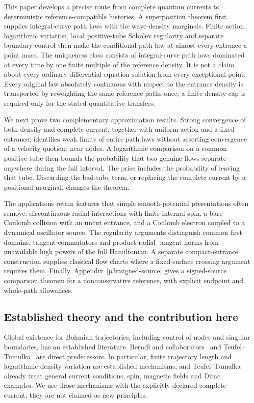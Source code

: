 \documentclass[11pt]{article}
\numberwithin{equation}{section}
\theoremstyle{definition}
\theoremstyle{remark}
\begin{document}
This paper develops a precise route from complete quantum currents to deterministic reference-compatible histories. A superposition theorem first supplies integral-curve path laws with the wave-density marginals. Finite action, logarithmic variation, local positive-tube Sobolev regularity and separate boundary control then make the conditional path law at almost every entrance a point mass. The uniqueness class consists of integral-curve path laws dominated at every time by one finite multiple of the reference density. It is not a claim about every ordinary differential equation solution from every exceptional point. Every original law absolutely continuous with respect to the entrance density is transported by reweighting the same reference paths once; a finite density cap is required only for the stated quantitative transfers.

We next prove two complementary approximation results. Strong convergence of both density and complete current, together with uniform action and a fixed entrance, identifies weak limits of entire path laws without asserting convergence of a velocity quotient near nodes. A logarithmic comparison on a common positive tube then bounds the probability that two genuine flows separate anywhere during the full interval. The price includes the probability of leaving that tube. Discarding the bad-tube term, or replacing the complete current by a positional marginal, changes the theorem.

The applications retain features that simple smooth-potential presentations often remove: discontinuous radial interactions with finite internal spin, a bare Coulomb collision with an uncut entrance, and a Coulomb electron coupled to a dynamical oscillator source. The regularity arguments distinguish common first domains, tangent commutators and product radial--tangent norms from unavailable high powers of the full Hamiltonian. A separate compact-entrance construction supplies classical flow charts where a fixed-surface crossing argument requires them. Finally, Appendix~\ref{p3r:signed-source} gives a signed-source comparison theorem for a nonconservative reference, with explicit endpoint and whole-path allowances.

\subsection{Established theory and the contribution here}\label{p3r:literature}
Global existence for Bohmian trajectories, including control of nodes and singular boundaries, has an established literature. Berndl and collaborators~\cite{BerndlEtAl1995} and Teufel--Tumulka~\cite{TTflow} are direct predecessors. In particular, finite trajectory length and logarithmic-density variation are established mechanisms, and Teufel--Tumulka already treat general current conditions, spin, magnetic fields and Dirac examples. We use those mechanisms with the explicitly declared complete current; they are not claimed as new principles.
\end{document}
